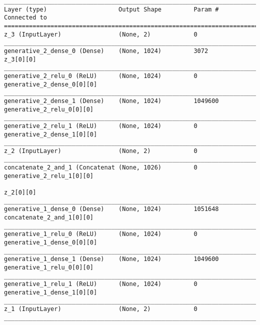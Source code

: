 \begin{lstlisting}[caption={\textsc{Mnist}-\ac{VLAE}-\ac{GAN} Decoder},captionpos=b,basicstyle=\tiny, label={lst:mnist-vlae-gan-decoder}]
__________________________________________________________________________________________________
Layer (type)                    Output Shape         Param #     Connected to
==================================================================================================
z_3 (InputLayer)                (None, 2)            0
__________________________________________________________________________________________________
generative_2_dense_0 (Dense)    (None, 1024)         3072        z_3[0][0]
__________________________________________________________________________________________________
generative_2_relu_0 (ReLU)      (None, 1024)         0           generative_2_dense_0[0][0]
__________________________________________________________________________________________________
generative_2_dense_1 (Dense)    (None, 1024)         1049600     generative_2_relu_0[0][0]
__________________________________________________________________________________________________
generative_2_relu_1 (ReLU)      (None, 1024)         0           generative_2_dense_1[0][0]
__________________________________________________________________________________________________
z_2 (InputLayer)                (None, 2)            0
__________________________________________________________________________________________________
concatenate_2_and_1 (Concatenat (None, 1026)         0           generative_2_relu_1[0][0]
                                                                 z_2[0][0]
__________________________________________________________________________________________________
generative_1_dense_0 (Dense)    (None, 1024)         1051648     concatenate_2_and_1[0][0]
__________________________________________________________________________________________________
generative_1_relu_0 (ReLU)      (None, 1024)         0           generative_1_dense_0[0][0]
__________________________________________________________________________________________________
generative_1_dense_1 (Dense)    (None, 1024)         1049600     generative_1_relu_0[0][0]
__________________________________________________________________________________________________
generative_1_relu_1 (ReLU)      (None, 1024)         0           generative_1_dense_1[0][0]
__________________________________________________________________________________________________
z_1 (InputLayer)                (None, 2)            0
__________________________________________________________________________________________________

\end{lstlisting}

